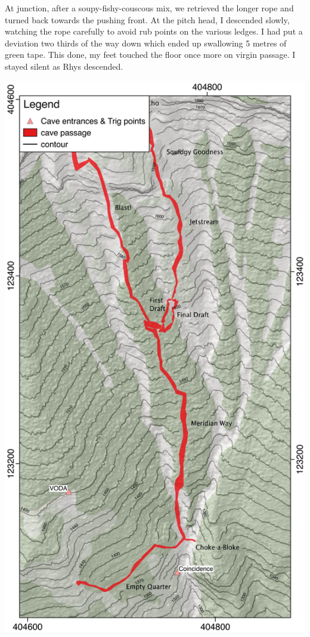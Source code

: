 At  junction, after a soupy-fishy-couscous mix, we retrieved the longer rope and turned back towards the pushing front. At the pitch head, I descended slowly, watching the rope carefully to avoid rub points on the various ledges. I had put a deviation two thirds of the way down which ended up swallowing 5 metres of green tape. This done, my feet touched the floor once more on virgin passage. I stayed silent as Rhys descended.

\begin{map}[t!]
\checkoddpage \ifoddpage \forcerectofloat \else \forceversofloat \fi
\centering
\includegraphics[width=\textwidth]{images/2015/tanguy-meridian-2015/meridian_map.pdf}

\end{map}
